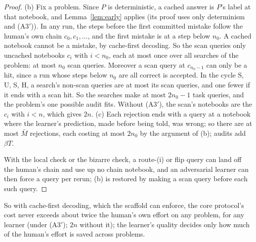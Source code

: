 \documentclass[11pt]{article}
\theoremstyle{definition}
\theoremstyle{remark}
\begin{document}
\begin{proof}
(b) Fix a problem. Since $P$ is deterministic, a cached answer is $P$'s label at that notebook, and Lemma~\ref{lem:early} applies (its proof uses only determinism and (A3$'$)). In any run, the steps before the first committed mistake follow the human's own chain $c_0,c_1,\dots$, and the first mistake is at a step below $n_0$. A cached notebook cannot be a mistake, by cache-first decoding. So the scan queries only uncached notebooks $c_i$ with $i<n_0$, each at most once over all searches of the problem: at most $n_0$ scan queries. Moreover a scan query at $c_{n_0-1}$ can only be a hit, since a run whose steps below $n_0$ are all correct is accepted. In the cycle S, U, S, H, a search's non-scan queries are at most its scan queries, and one fewer if it ends with a scan hit. So the searches make at most $2n_0-1$ task queries, and the problem's one possible audit fits. Without (A3$'$), the scan's notebooks are the $c_i$ with $i<n$, which gives $2n$.
(c) Each rejection ends with a query at a notebook where the learner's prediction, made before being told, was wrong; so there are at most $\bar M$ rejections, each costing at most $2n_0$ by the argument of (b); audits add $\beta T$.

With the local check or the bizarre check, a route-(i) or flip query can land off the human's chain and use up no chain notebook, and an adversarial learner can then force a query per rerun; (b) is restored by making a scan query before each such query.
\end{proof}

So with cache-first decoding, which the scaffold can enforce, the core protocol's cost never exceeds about twice the human's own effort on any problem, for any learner (under (A3$'$); $2n$ without it); the learner's quality decides only how much of the human's effort is saved across problems.
\end{document}
